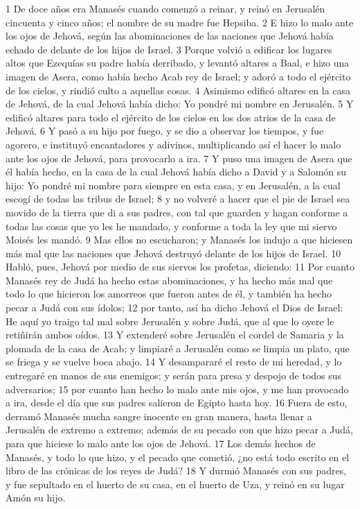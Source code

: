 1 De doce años era Manasés cuando comenzó a reinar, y reinó en Jerusalén cincuenta y cinco años; el nombre de su madre fue Hepsiba.
2 E hizo lo malo ante los ojos de Jehová, según las abominaciones de las naciones que Jehová había echado de delante de los hijos de Israel.
3 Porque volvió a edificar los lugares altos que Ezequías su padre había derribado, y levantó altares a Baal, e hizo una imagen de Asera, como había hecho Acab rey de Israel; y adoró a todo el ejército de los cielos, y rindió culto a aquellas cosas.
4 Asimismo edificó altares en la casa de Jehová, de la cual Jehová había dicho: Yo pondré mi nombre en Jerusalén. 
5 Y edificó altares para todo el ejército de los cielos en los dos atrios de la casa de Jehová.
6 Y pasó a su hijo por fuego, y se dio a observar los tiempos, y fue agorero, e instituyó encantadores y adivinos, multiplicando así el hacer lo malo ante los ojos de Jehová, para provocarlo a ira.
7 Y puso una imagen de Asera que él había hecho, en la casa de la cual Jehová había dicho a David y a Salomón su hijo: Yo pondré mi nombre para siempre en esta casa, y en Jerusalén, a la cual escogí de todas las tribus de Israel;
8 y no volveré a hacer que el pie de Israel sea movido de la tierra que di a sus padres, con tal que guarden y hagan conforme a todas las cosas que yo les he mandado, y conforme a toda la ley que mi siervo Moisés les mandó. 
9 Mas ellos no escucharon; y Manasés los indujo a que hiciesen más mal que las naciones que Jehová destruyó delante de los hijos de Israel.
10 Habló, pues, Jehová por medio de sus siervos los profetas, diciendo:
11 Por cuanto Manasés rey de Judá ha hecho estas abominaciones, y ha hecho más mal que todo lo que hicieron los amorreos que fueron antes de él, y también ha hecho pecar a Judá con sus ídolos;
12 por tanto, así ha dicho Jehová el Dios de Israel: He aquí yo traigo tal mal sobre Jerusalén y sobre Judá, que al que lo oyere le retiñirán ambos oídos.
13 Y extenderé sobre Jerusalén el cordel de Samaria y la plomada de la casa de Acab; y limpiaré a Jerusalén como se limpia un plato, que se friega y se vuelve boca abajo.
14 Y desampararé el resto de mi heredad, y lo entregaré en manos de sus enemigos; y serán para presa y despojo de todos sus adversarios;
15 por cuanto han hecho lo malo ante mis ojos, y me han provocado a ira, desde el día que sus padres salieron de Egipto hasta hoy.
16 Fuera de esto, derramó Manasés mucha sangre inocente en gran manera, hasta llenar a Jerusalén de extremo a extremo; además de su pecado con que hizo pecar a Judá, para que hiciese lo malo ante los ojos de Jehová.
17 Los demás hechos de Manasés, y todo lo que hizo, y el pecado que cometió, ¿no está todo escrito en el libro de las crónicas de los reyes de Judá?
18 Y durmió Manasés con sus padres, y fue sepultado en el huerto de su casa, en el huerto de Uza, y reinó en su lugar Amón su hijo.

